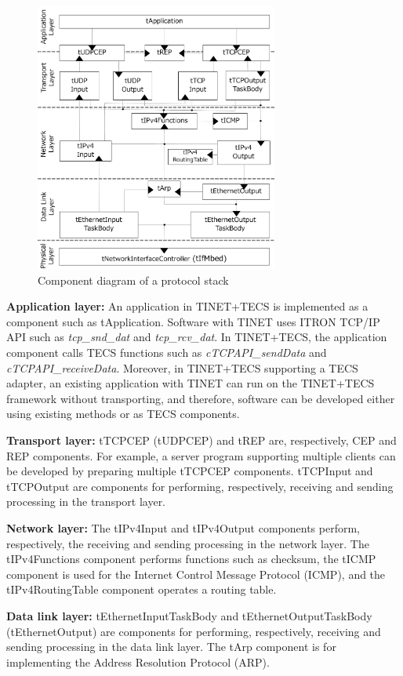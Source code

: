 \documentclass[a4j,12pt,oneside,openany,english]{jsbook}
\begin{document}
\begin{figure}[t]
    \centering
    \includegraphics[width=8.0cm,clip]{figure/ComponentProtocolStack.pdf}
    \caption{Component diagram of a protocol stack}
    \label{fig:ComponentProtocolStack}
\end{figure}


{\bf Application layer:}
An application in TINET+TECS is implemented as a component such as tApplication.
Software with TINET uses ITRON TCP/IP API \cite{url:ITRON_TCP/IP_API_Spec} such as {\it tcp\_snd\_dat} and {\it tcp\_rcv\_dat}.
In TINET+TECS, the application component calls TECS functions such as {\it cTCPAPI\_sendData} and {\it cTCPAPI\_receiveData}.
Moreover, in TINET+TECS supporting a TECS adapter, an existing application with TINET can run on the TINET+TECS framework without transporting, and therefore, software can be developed either using existing methods or as TECS components.

{\bf Transport layer:}
tTCPCEP (tUDPCEP) and tREP are, respectively, CEP and REP components.
For example, a server program supporting multiple clients can be developed by preparing multiple tTCPCEP components.
tTCPInput and tTCPOutput are components for performing, respectively, receiving and sending processing in the transport layer.

{\bf Network layer:}
The tIPv4Input and tIPv4Output components perform, respectively, the receiving and sending processing in the network layer.
The tIPv4Functions component performs functions such as checksum, the tICMP component is used for the Internet Control Message Protocol (ICMP), and the tIPv4RoutingTable component operates a routing table.

{\bf Data link layer:}
tEthernetInputTaskBody and tEthernetOutputTaskBody (tEthernetOutput) are components for performing, respectively, receiving and sending processing in the data link layer.
The tArp component is for implementing the Address Resolution Protocol (ARP).
\end{document}
